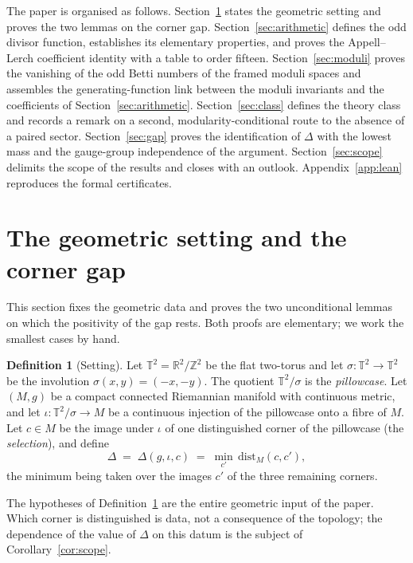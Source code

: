 \documentclass[11pt,a4paper]{article}
\newcommand{\T}{\mathbb{T}}
\newcommand{\R}{\mathbb{R}}
\newcommand{\Z}{\mathbb{Z}}
\newcommand{\dist}{\mathrm{dist}}
\theoremstyle{plain}
\theoremstyle{definition}
\newtheorem{definition}[theorem]{Definition}
\theoremstyle{remark}
\begin{document}
The paper is organised as follows. Section~\ref{sec:setting} states
the geometric setting and proves the two lemmas on the corner gap.
Section~\ref{sec:arithmetic} defines the odd divisor function,
establishes its elementary properties, and proves the Appell--Lerch
coefficient identity with a table to order fifteen.
Section~\ref{sec:moduli} proves the vanishing of the odd Betti numbers
of the framed moduli spaces and assembles the generating-function link
between the moduli invariants and the coefficients of
Section~\ref{sec:arithmetic}. Section~\ref{sec:class} defines the
theory class and records a remark on a second, modularity-conditional
route to the absence of a paired sector. Section~\ref{sec:gap} proves
the identification of $\Delta$ with the lowest mass and the
gauge-group independence of the argument. Section~\ref{sec:scope}
delimits the scope of the results and closes with an outlook.
Appendix~\ref{app:lean} reproduces the formal certificates.

\section{The geometric setting and the corner gap}\label{sec:setting}

This section fixes the geometric data and proves the two unconditional
lemmas on which the positivity of the gap rests. Both proofs are
elementary; we work the smallest cases by hand.

\begin{definition}[Setting]\label{def:setting}
Let $\T^2 = \R^2/\Z^2$ be the flat two-torus and let
$\sigma \colon \T^2 \to \T^2$ be the involution
$\sigma(x,y) = (-x,-y)$. The quotient $\T^2/\sigma$ is the
\emph{pillowcase}. Let $(M,g)$ be a compact connected Riemannian
manifold with continuous metric, and let
$\iota \colon \T^2/\sigma \to M$ be a continuous injection of the
pillowcase onto a fibre of $M$. Let $c \in M$ be the image under
$\iota$ of one distinguished corner of the pillowcase (the
\emph{selection}), and define
\begin{equation}\label{eq:gapdef}
  \Delta \;=\; \Delta(g, \iota, c) \;=\;
  \min_{c'} \, \dist_M(c, c'),
\end{equation}
the minimum being taken over the images $c'$ of the three remaining
corners.
\end{definition}

The hypotheses of Definition~\ref{def:setting} are the entire
geometric input of the paper. Which corner is distinguished is data,
not a consequence of the topology; the dependence of the value of
$\Delta$ on this datum is the subject of
Corollary~\ref{cor:scope}.
\end{document}

